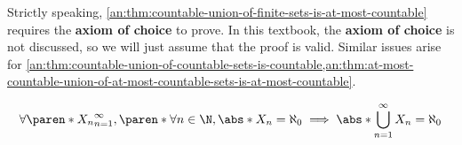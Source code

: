 \bigskip

\begin{remark}
  Strictly speaking, \cref{an:thm:countable-union-of-finite-sets-is-at-most-countable} requires the
  \textbf{axiom of choice} to prove. In this textbook, the \textbf{axiom of choice} is not discussed,
  so we will just assume that the proof is valid. Similar issues arise for
  \cref{an:thm:countable-union-of-countable-sets-is-countable,an:thm:at-most-countable-union-of-at-most-countable-sets-is-at-most-countable}.
\end{remark}

\bigskip

\begin{theorem} \label{an:thm:countable-union-of-countable-sets-is-countable}
  \[
    \forall \paren*{X_{n}}_{n = 1}^{\infty},
    \paren*{\forall n \in \N, \abs*{X_{n}} = \aleph_{0}}
    \implies \abs*{\bigcup_{n = 1}^{\infty} X_{n}} = \aleph_{0}
  \]
\end{theorem}

